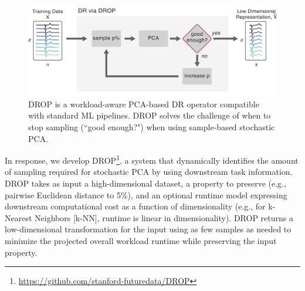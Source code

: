 \begin{figure}
\includegraphics[width=\linewidth]{figs/basic.pdf}
\caption[]{DROP is a workload-aware PCA-based DR operator compatible with standard ML pipelines. DROP solves the challenge of when to stop sampling (``good enough?") when using sample-based stochastic PCA.}
\label{fig:basic}
\end{figure}

In response, we develop DROP\footnote{\href{https://github.com/stanford-futuredata/DROP}{https://github.com/stanford-futuredata/DROP}}, a system that dynamically identifies the amount of sampling required for stochastic PCA by using downstream task information.
DROP takes as input a high-dimensional dataset,
a property to preserve (e.g., pairwise Euclidean distance to 5\%), and an optional runtime model expressing downstream computational cost as a function of dimensionality (e.g., for k-Nearest Neighbors [k-NN], runtime is linear in dimensionality). 
DROP returns a low-dimensional transformation for the input using as few samples as needed to minimize the projected overall workload runtime while preserving the input property. 


